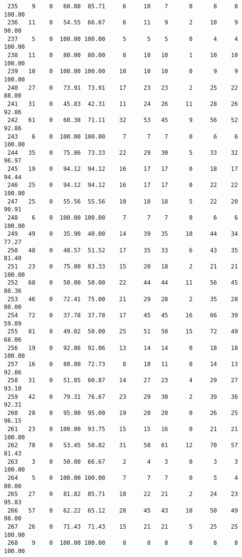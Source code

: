 \begin{verbatim}
 235    9    0   60.00  85.71     6     10    7      0      8     8   100.00
 236   11    0   54.55  66.67     6     11    9      2     10     9    90.00
 237    5    0  100.00 100.00     5      5    5      0      4     4   100.00
 238   11    0   80.00  80.00     8     10   10      1     10    10   100.00
 239   10    0  100.00 100.00    10     10   10      0      9     9   100.00
 240   27    0   73.91  73.91    17     23   23      2     25    22    88.00
 241   31    0   45.83  42.31    11     24   26     11     28    26    92.86
 242   61    0   60.38  71.11    32     53   45      9     56    52    92.86
 243    6    0  100.00 100.00     7      7    7      0      6     6   100.00
 244   35    0   75.86  73.33    22     29   30      5     33    32    96.97
 245   19    0   94.12  94.12    16     17   17      0     18    17    94.44
 246   25    0   94.12  94.12    16     17   17      0     22    22   100.00
 247   25    0   55.56  55.56    10     18   18      5     22    20    90.91
 248    6    0  100.00 100.00     7      7    7      0      6     6   100.00
 249   49    0   35.90  40.00    14     39   35     10     44    34    77.27
 250   48    0   48.57  51.52    17     35   33      6     43    35    81.40
 251   23    0   75.00  83.33    15     20   18      2     21    21   100.00
 252   68    0   50.00  50.00    22     44   44     11     56    45    80.36
 253   46    0   72.41  75.00    21     29   28      2     35    28    80.00
 254   72    0   37.78  37.78    17     45   45     16     66    39    59.09
 255   81    0   49.02  50.00    25     51   50     15     72    49    68.06
 256   19    0   92.86  92.86    13     14   14      0     18    18   100.00
 257   16    0   80.00  72.73     8     10   11      0     14    13    92.86
 258   31    0   51.85  60.87    14     27   23      4     29    27    93.10
 259   42    0   79.31  76.67    23     29   30      2     39    36    92.31
 260   28    0   95.00  95.00    19     20   20      0     26    25    96.15
 261   23    0  100.00  93.75    15     15   16      0     21    21   100.00
 262   78    0   53.45  50.82    31     58   61     12     70    57    81.43
 263    3    0   50.00  66.67     2      4    3      0      3     3   100.00
 264    5    0  100.00 100.00     7      7    7      0      5     4    80.00
 265   27    0   81.82  85.71    18     22   21      2     24    23    95.83
 266   57    0   62.22  65.12    28     45   43     10     50    49    98.00
 267   26    0   71.43  71.43    15     21   21      5     25    25   100.00
 268    9    0  100.00 100.00     8      8    8      0      8     8   100.00

\end{verbatim}
